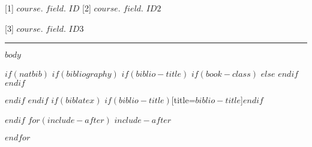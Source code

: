 \documentclass[$if(fontsize)$$fontsize$,$endif$$if(lang)$$babel-lang$,$endif$$if(papersize)$$papersize$paper,$endif$$for(classoption)$$classoption$$sep$,$endfor$]{article}
\begin{document}
\begin{flushleft}


\footnotesize{[1] $course$. $field$. $ID$ }
\vspace{-0.25cm}
\footnotesize{[2] $course$. $field$. $ID2$ }
\vspace{-0.15cm}

\footnotesize{[3] $course$. $field$. $ID3$ }
\vspace{-0.5cm}
\rule{160mm}{0.1mm}
\end{flushleft}


\setcounter{tocdepth}{$toc-depth$}

\begin{multicols}{2}
$body$
\end{multicols}



$if(natbib)$
$if(bibliography)$
$if(biblio-title)$
$if(book-class)$
\renewcommand\bibname{$biblio-title$}
$else$
\renewcommand\refname{$biblio-title$}
$endif$
$endif$
\newpage


$endif$
$endif$
$if(biblatex)$
\newpage
\printbibliography$if(biblio-title)$[title=$biblio-title$]$endif$

$endif$
$for(include-after)$
$include-after$

$endfor$
\end{document}
